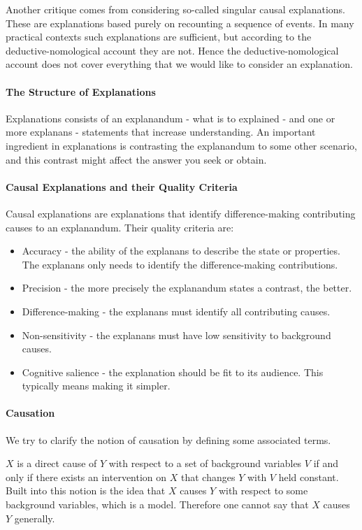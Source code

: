 Another critique comes from considering so-called singular causal explanations. These are explanations based purely on recounting a sequence of events. In many practical contexts such explanations are sufficient, but according to the deductive-nomological account they are not. Hence the deductive-nomological account does not cover everything that we would like to consider an explanation.

\paragraph{The Structure of Explanations}
Explanations consists of an explanandum - what is to explained - and one or more explanans - statements that increase understanding. An important ingredient in explanations is contrasting the explanandum to some other scenario, and this contrast might affect the answer you seek or obtain.

\paragraph{Causal Explanations and their Quality Criteria}
Causal explanations are explanations that identify difference-making contributing causes to an explanandum. Their quality criteria are:
\begin{itemize}
	\item Accuracy - the ability of the explanans to describe the state or properties. The explanans only needs to identify the difference-making contributions.
	\item Precision - the more precisely the explanandum states a contrast, the better.
	\item Difference-making - the explanans must identify all contributing causes.
	\item Non-sensitivity - the explanans must have low sensitivity to background causes.
	\item Cognitive salience - the explanation should be fit to its audience. This typically means making it simpler.
\end{itemize}

\paragraph{Causation}
We try to clarify the notion of causation by defining some associated terms.

$X$ is a direct cause of $Y$ with respect to a set of background variables $V$ if and only if there exists an intervention on $X$ that changes $Y$ with $V$ held constant. Built into this notion is the idea that $X$ causes $Y$ with respect to some background variables, which is a model. Therefore one cannot say that $X$ causes $Y$ generally.

